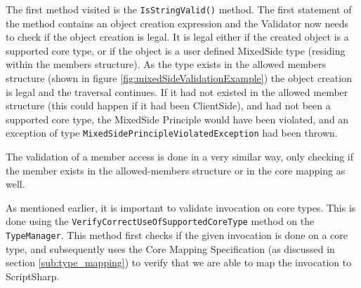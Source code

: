 		The first method visited is the \texttt{IsStringValid()} method. The first statement of the method contains an object creation expression and the Validator now needs to check if the object creation is legal. It is legal either if the created object is a supported core type, or if the object is a user defined MixedSide type (residing within the members structure). As the type exists in the allowed members structure (shown in figure \ref{fig:mixedSideValidationExample}) the object creation is legal and the traversal continues. If it had not existed in the allowed member structure (this could happen if it had been ClientSide), and had not been a supported core type, the MixedSide Principle would have been violated, and an exception of type \texttt{MixedSidePrincipleViolatedException} had been thrown.

		The validation of a member access is done in a very similar way, only checking if the member exists in the allowed-members structure or in the core mapping as well.

		As mentioned earlier, it is important to validate invocation on core types. This is done using the \texttt{VerifyCorrectUseOfSupportedCoreType} method on the \texttt{TypeManager}. This method first checks if the given invocation is done on a core type, and subsequently uses the Core Mapping Specification (as discussed in section \ref{sub:type_mapping}) to verify that we are able to map the invocation to ScriptSharp.
		











	
